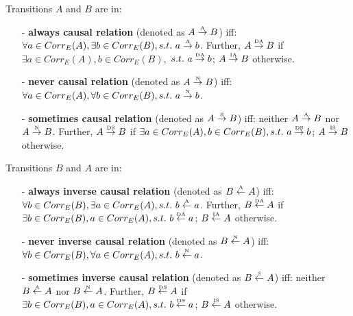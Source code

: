 \documentclass{llncs}
\begin{document}
\begin{definition}\label{def:causalRelations}
Transitions $A$ and $B$ are in: 
	\begin{itemize}
		\item[-] \textbf{always causal relation} (denoted as $A\overset{\text{\tiny{A}}}{\rightarrow} B$) iff: $\forall a\in Corr_{E}(A), \exists b\in Corr_{E}(B), s.t.~a\overset{\text{\tiny{A}}}{\rightarrow} b$. Further, $A\overset{\text{\tiny{DA}}}{\rightarrow}B$ if $\exists a\in Corr_{E}(A), b\in Corr_{E}(B),$ $s.t.~a\overset{\text{\tiny{DA}}}{\rightarrow}b$; $A\overset{\text{\tiny{IA}}}{\rightarrow}B$ otherwise.
		\item[-] \textbf{never causal relation} (denoted as $A\overset{\text{\tiny{N}}}{\rightarrow} B$) iff: $\forall a\in Corr_{E}(A), \forall b\in Corr_{E}(B), s.t.~a\overset{\text{\tiny{N}}}{\rightarrow} b$.
		\item[-] \textbf{sometimes causal relation} (denoted as $A\overset{\text{\tiny{S}}}{\rightarrow} B$) iff: neither $A\overset{\text{\tiny{A}}}{\rightarrow} B$ nor $A\overset{\text{\tiny{N}}}{\rightarrow} B$. Further, $A\overset{\text{\tiny{DS}}}{\rightarrow}B$ if $\exists a\in Corr_{E}(A), b\in Corr_{E}(B), s.t.~a\overset{\text{\tiny{DS}}}{\rightarrow}b$; $A\overset{\text{\tiny{IS}}}{\rightarrow}B$ otherwise.
	\end{itemize}  
\end{definition}

\begin{definition}\label{def:inverseCausalRelations}
Transitions $B$ and $A$ are in: 
	\begin{itemize}
		\item[-] \textbf{always inverse causal relation} (denoted as $B\overset{\text{\tiny{A}}}{\leftarrow} A$) iff: $\forall b\in Corr_{E}(B), \exists a\in Corr_{E}(A), s.t.~b\overset{\text{\tiny{A}}}{\leftarrow} a$. Further, $B\overset{\text{\tiny{DA}}}{\leftarrow}A$ if $\exists b\in Corr_{E}(B), a\in Corr_{E}(A),s.t.~b\overset{\text{\tiny{DA}}}{\leftarrow}a$; $B\overset{\text{\tiny{IA}}}{\leftarrow}A$ otherwise.
		\item[-] \textbf{never inverse causal relation} (denoted as $B\overset{\text{\tiny{N}}}{\leftarrow} A$) iff: $\forall b\in Corr_{E}(B), \forall a\in Corr_{E}(A), s.t.~b\overset{\text{\tiny{N}}}{\leftarrow} a$.
		\item[-] \textbf{sometimes inverse causal relation} (denoted as $B\overset{\text{\tiny{S}}}{\leftarrow} A$) iff: neither $B\overset{\text{\tiny{A}}}{\leftarrow} A$ nor $B\overset{\text{\tiny{N}}}{\leftarrow} A$. Further, $B\overset{\text{\tiny{DS}}}{\leftarrow}A$ if $\exists b\in Corr_{E}(B), a\in Corr_{E}(A), s.t.~b\overset{\text{\tiny{DS}}}{\leftarrow}a$; $B\overset{\text{\tiny{IS}}}{\leftarrow}A$ otherwise.
	\end{itemize}
\end{definition}
\end{document}

